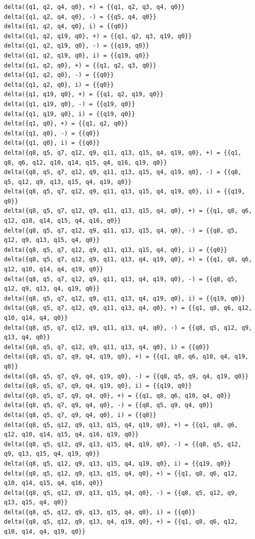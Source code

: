 \documentclass[12pt,a4paper]{report}
\begin{document}
\begin{lstlisting}
delta({q1, q2, q4, q0}, +) = {{q1, q2, q3, q4, q0}}
delta({q1, q2, q4, q0}, -) = {{q5, q4, q0}}
delta({q1, q2, q4, q0}, i) = {{q0}}
delta({q1, q2, q19, q0}, +) = {{q1, q2, q3, q19, q0}}
delta({q1, q2, q19, q0}, -) = {{q19, q0}}
delta({q1, q2, q19, q0}, i) = {{q19, q0}}
delta({q1, q2, q0}, +) = {{q1, q2, q3, q0}}
delta({q1, q2, q0}, -) = {{q0}}
delta({q1, q2, q0}, i) = {{q0}}
delta({q1, q19, q0}, +) = {{q1, q2, q19, q0}}
delta({q1, q19, q0}, -) = {{q19, q0}}
delta({q1, q19, q0}, i) = {{q19, q0}}
delta({q1, q0}, +) = {{q1, q2, q0}}
delta({q1, q0}, -) = {{q0}}
delta({q1, q0}, i) = {{q0}}
delta({q8, q5, q7, q12, q9, q11, q13, q15, q4, q19, q0}, +) = {{q1, q8, q6, q12, q10, q14, q15, q4, q16, q19, q0}}
delta({q8, q5, q7, q12, q9, q11, q13, q15, q4, q19, q0}, -) = {{q8, q5, q12, q9, q13, q15, q4, q19, q0}}
delta({q8, q5, q7, q12, q9, q11, q13, q15, q4, q19, q0}, i) = {{q19, q0}}
delta({q8, q5, q7, q12, q9, q11, q13, q15, q4, q0}, +) = {{q1, q8, q6, q12, q10, q14, q15, q4, q16, q0}}
delta({q8, q5, q7, q12, q9, q11, q13, q15, q4, q0}, -) = {{q8, q5, q12, q9, q13, q15, q4, q0}}
delta({q8, q5, q7, q12, q9, q11, q13, q15, q4, q0}, i) = {{q0}}
delta({q8, q5, q7, q12, q9, q11, q13, q4, q19, q0}, +) = {{q1, q8, q6, q12, q10, q14, q4, q19, q0}}
delta({q8, q5, q7, q12, q9, q11, q13, q4, q19, q0}, -) = {{q8, q5, q12, q9, q13, q4, q19, q0}}
delta({q8, q5, q7, q12, q9, q11, q13, q4, q19, q0}, i) = {{q19, q0}}
delta({q8, q5, q7, q12, q9, q11, q13, q4, q0}, +) = {{q1, q8, q6, q12, q10, q14, q4, q0}}
delta({q8, q5, q7, q12, q9, q11, q13, q4, q0}, -) = {{q8, q5, q12, q9, q13, q4, q0}}
delta({q8, q5, q7, q12, q9, q11, q13, q4, q0}, i) = {{q0}}
delta({q8, q5, q7, q9, q4, q19, q0}, +) = {{q1, q8, q6, q10, q4, q19, q0}}
delta({q8, q5, q7, q9, q4, q19, q0}, -) = {{q8, q5, q9, q4, q19, q0}}
delta({q8, q5, q7, q9, q4, q19, q0}, i) = {{q19, q0}}
delta({q8, q5, q7, q9, q4, q0}, +) = {{q1, q8, q6, q10, q4, q0}}
delta({q8, q5, q7, q9, q4, q0}, -) = {{q8, q5, q9, q4, q0}}
delta({q8, q5, q7, q9, q4, q0}, i) = {{q0}}
delta({q8, q5, q12, q9, q13, q15, q4, q19, q0}, +) = {{q1, q8, q6, q12, q10, q14, q15, q4, q16, q19, q0}}
delta({q8, q5, q12, q9, q13, q15, q4, q19, q0}, -) = {{q8, q5, q12, q9, q13, q15, q4, q19, q0}}
delta({q8, q5, q12, q9, q13, q15, q4, q19, q0}, i) = {{q19, q0}}
delta({q8, q5, q12, q9, q13, q15, q4, q0}, +) = {{q1, q8, q6, q12, q10, q14, q15, q4, q16, q0}}
delta({q8, q5, q12, q9, q13, q15, q4, q0}, -) = {{q8, q5, q12, q9, q13, q15, q4, q0}}
delta({q8, q5, q12, q9, q13, q15, q4, q0}, i) = {{q0}}
delta({q8, q5, q12, q9, q13, q4, q19, q0}, +) = {{q1, q8, q6, q12, q10, q14, q4, q19, q0}}

\end{lstlisting}
\end{document}
